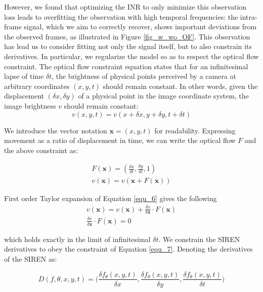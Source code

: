 \documentclass{article}
\begin{document}
However, we found that optimizing the INR to only minimize this observation loss leads to overfitting the observation with high temporal frequencies:
the intra-frame signal, which we aim to correctly recover, shows important deviations from the observed frames, as illustrated in Figure \ref{fig_w_wo_OF}.
This observation has lead us to consider fitting not only the signal itself, but to also constrain its derivatives.
In particular, we regularize the model so as to respect the optical flow constraint.
The optical flow constraint equation states that for an infinitesimal lapse of time $\delta t$,
the brightness of physical points perceived by a camera at arbitrary coordinates $(x,y,t)$ should remain constant.
In other words, given the displacement $(\delta x, \delta y)$ of a physical point in the image coordinate system,
the image brightness $v$ should remain constant:
\begin{equation}
v(x, y, t)=v(x + \delta x, y + \delta y, t + \delta t)
\end{equation}

We introduce the vector notation $\textbf{x}=(x,y,t)$ for readability.
Expressing movement as a ratio of displacement in time,
we can write the optical flow $F$ and the above constraint as:

\begin{equation}
\begin{aligned}
F(\textbf{x})=(\frac{\delta x}{\delta t}, \frac{\delta y}{\delta t}, 1) \\
v(\textbf{x})=v(\textbf{x} + F(\textbf{x}))
\end{aligned}
\label{equ_6}
\end{equation}

First order Taylor expansion of Equation \ref{equ_6} gives the following
\begin{equation}
\begin{aligned}
v(\textbf{x}) = v(\textbf{x}) + \frac{\delta v}{\delta \textbf{x}} \cdot F(\textbf{x}) \\
\frac{\delta v}{\delta \textbf{x}} \cdot F(\textbf{x}) =0
\end{aligned}
\label{equ_7}
\end{equation}


which holds exactly in the limit of infinitesimal $\delta t$.
We constrain the SIREN derivatives to obey the constraint of Equation \ref{equ_7}.
Denoting the derivatives of the SIREN as:

\begin{equation}
D(f, \theta, x, y, t)=\Big(\frac{\delta f_{\theta}(x,y,t)}{\delta x}, \frac{\delta f_{\theta}(x,y,t)}{\delta y}, \frac{\delta f_{\theta}(x,y,t)}{\delta t}\Big)
\end{equation}
\end{document}
